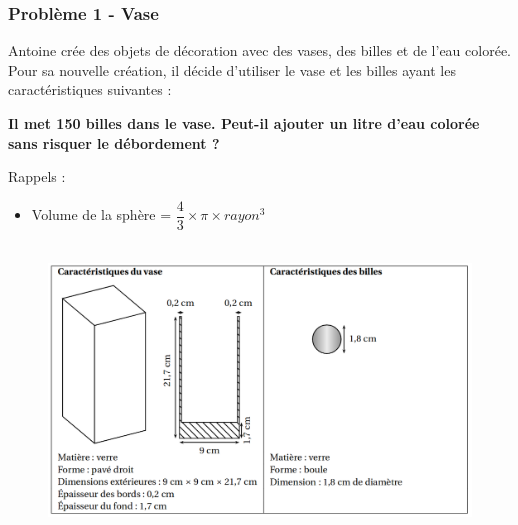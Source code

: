 \documentclass[11pt]{article}
\begin{document}
\begin{multicols}{2}

\subsubsection*{Problème 1 - Vase}

Antoine crée des objets de décoration avec des vases, des billes et de l’eau colorée. Pour sa nouvelle création, il décide d’utiliser le vase et les billes ayant les caractéristiques suivantes :

\textbf{Il met 150 billes dans le vase. Peut-il ajouter un litre d’eau colorée sans risquer le débordement ?}

Rappels : 

\begin{itemize}
\item Volume de la sphère = $\dfrac{4}{3} \times \pi  \times rayon^3$
\end{itemize}

\begin{figure}[H]
      \centering
      \includegraphics[width=\linewidth]{3x3-volumes-1/sources/bille.png}
\end{figure}

\end{multicols}
\end{document}
